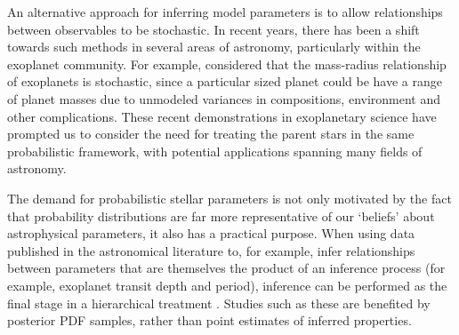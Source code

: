 \documentclass[apjl]{emulateapj}
\begin{document}
An alternative approach for inferring model parameters is to allow
relationships between observables to be stochastic.
In recent years, there has been a shift towards such methods in several areas
of astronomy, particularly within the exoplanet community.
For example, \citet{wolfgang:2015} considered that the mass-radius
relationship of exoplanets is stochastic, since a particular sized planet
could be have a range of planet masses due to unmodeled variances in
compositions, environment and other complications.
These recent demonstrations in exoplanetary science have prompted us to
consider the need for treating the parent stars in the same probabilistic
framework, with potential applications spanning many fields of astronomy.

The demand for probabilistic stellar parameters is not only motivated by the
fact that probability distributions are far more representative of our
`beliefs' about astrophysical parameters, it also has a practical purpose.
When using data published in the astronomical literature to, for example,
infer relationships between parameters that are themselves the product of an
inference process (for example, exoplanet transit depth and period), inference
can be performed as the final stage in a hierarchical treatment \citep[see,
e.g.][]{foreman-mackey:2014}.
Studies such as these are benefited by posterior PDF samples, rather than
point estimates of inferred properties.


\end{document}
